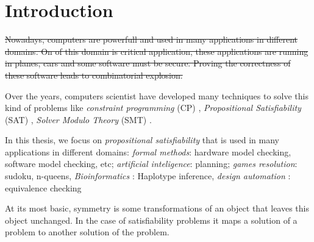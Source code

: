 \chapter{Introduction}\label{chap:intro}


\st{Nowadays, computers are powerfull and used in many applications in different domains.
On of this domain is critical application, these applications are running in planes, cars
and some software must be secure. Proving the correctness of these software leads
to combinatorial explosion.
}

Over the years, computers scientist have developed many techniques to solve 
this kind of problems like \emph{constraint programming} (CP) \cite{rossi2006handbook},
\emph{Propositional Satisfiability} (SAT) \cite{biere2009handbook},
\emph{Solver Modulo Theory} (SMT) \cite{barrett2018satisfiability}.

In this thesis, we focus on \emph{propositional satisfiability} that is used in many
applications in different domains: \emph{formal methods}: hardware model checking,
software model checking, etc; \emph{artificial inteligence}: planning; \emph{games resolution}:
sudoku, n-queens, \emph{Bioinformatics} : Haplotype inference,
\emph{design automation} : equivalence checking
 



At its most basic, symmetry is some transformations of an object that leaves this 
object unchanged. In the case of satisfiability problems it maps a solution of a problem to another
solution of the problem.





